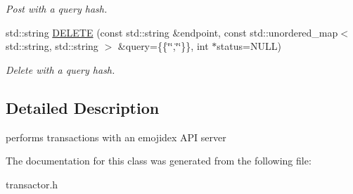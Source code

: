 \begin{DoxyCompactItemize}
\begin{DoxyCompactList}\small\item\em Post with a query hash. \end{DoxyCompactList}\item 
std\+::string \hyperlink{classEmojidex_1_1Service_1_1Transactor_a9e9d1edc59867650851b99129b6dcc1d}{D\+E\+L\+E\+TE} (const std\+::string \&endpoint, const std\+::unordered\+\_\+map$<$ std\+::string, std\+::string $>$ \&query=\{\{\char`\"{}\char`\"{},\char`\"{}\char`\"{}\}\}, int $\ast$status=N\+U\+LL)\hypertarget{classEmojidex_1_1Service_1_1Transactor_a9e9d1edc59867650851b99129b6dcc1d}{}\label{classEmojidex_1_1Service_1_1Transactor_a9e9d1edc59867650851b99129b6dcc1d}

\begin{DoxyCompactList}\small\item\em Delete with a query hash. \end{DoxyCompactList}\end{DoxyCompactItemize}


\subsection{Detailed Description}
performs transactions with an emojidex A\+PI server 

The documentation for this class was generated from the following file\+:\begin{DoxyCompactItemize}
\item 
transactor.\+h\end{DoxyCompactItemize}
